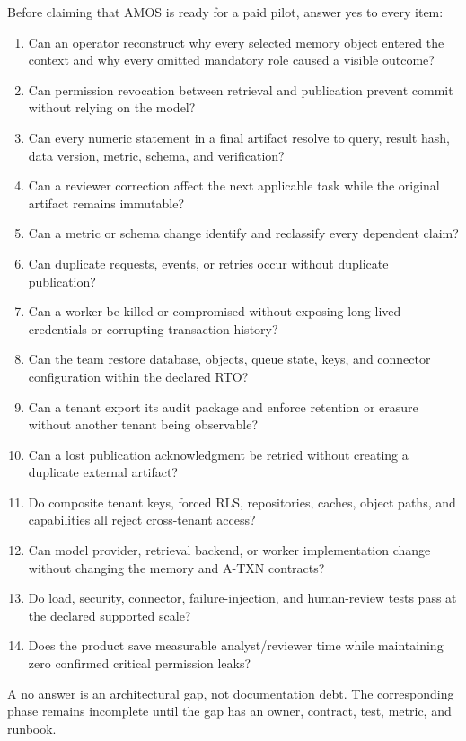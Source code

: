 \documentclass[10pt]{article}
\newcommand{\atxn}{\textsc{A-TXN}\xspace}
\begin{document}
Before claiming that AMOS is ready for a paid pilot, answer yes to every item:
\begin{enumerate}
  \item Can an operator reconstruct why every selected memory object entered the context and why every omitted mandatory role caused a visible outcome?
  \item Can permission revocation between retrieval and publication prevent commit without relying on the model?
  \item Can every numeric statement in a final artifact resolve to query, result hash, data version, metric, schema, and verification?
  \item Can a reviewer correction affect the next applicable task while the original artifact remains immutable?
  \item Can a metric or schema change identify and reclassify every dependent claim?
  \item Can duplicate requests, events, or retries occur without duplicate publication?
  \item Can a worker be killed or compromised without exposing long-lived credentials or corrupting transaction history?
  \item Can the team restore database, objects, queue state, keys, and connector configuration within the declared RTO?
  \item Can a tenant export its audit package and enforce retention or erasure without another tenant being observable?
  \item Can a lost publication acknowledgment be retried without creating a duplicate external artifact?
  \item Do composite tenant keys, forced RLS, repositories, caches, object paths, and capabilities all reject cross-tenant access?
  \item Can model provider, retrieval backend, or worker implementation change without changing the memory and \atxn contracts?
  \item Do load, security, connector, failure-injection, and human-review tests pass at the declared supported scale?
  \item Does the product save measurable analyst/reviewer time while maintaining zero confirmed critical permission leaks?
\end{enumerate}

A no answer is an architectural gap, not documentation debt. The corresponding phase remains incomplete until the gap has an owner, contract, test, metric, and runbook.
\end{document}
